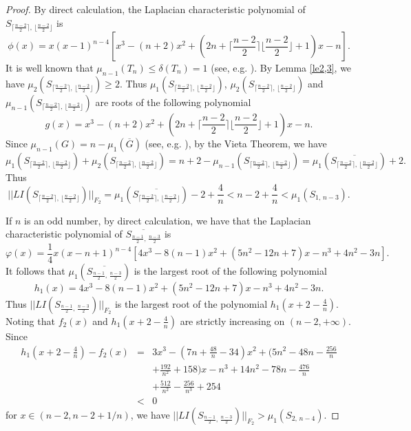 \documentclass[12pt, a4paper]{article}
\begin{document}
\begin{proof}
By direct calculation, the Laplacian characteristic polynomial of $S_{\lceil\frac{n-2}{2}\rceil, \, \lfloor\frac{n-2}{2}\rfloor}$ is
$$\phi(x)=x(x-1)^{n-4}[x^3-(n+2)x^2+(2n+\lceil\frac{n-2}{2}\rceil \lfloor\frac{n-2}{2}\rfloor+1)x-n].$$
It is well known that  $\mu_{n-1}(T_n)\leq \delta(T_n)=1$ (see, e.g. \cite{F}).  By Lemma \ref{le2,3}, we have $\mu_{2}(S_{\lceil\frac{n-2}{2}\rceil, \, \lfloor\frac{n-2}{2}\rfloor})\geq 2$. Thus $\mu_1(S_{\lceil\frac{n-2}{2}\rceil, \, \lfloor\frac{n-2}{2}\rfloor})$, $\mu_{2}(S_{\lceil\frac{n-2}{2}\rceil, \, \lfloor\frac{n-2}{2}\rfloor})$ and $\mu_{n-1}(S_{\lceil\frac{n-2}{2}\rceil, \, \lfloor\frac{n-2}{2}\rfloor})$ are roots of the following polynomial
$$g(x)= x^3-(n+2)x^2+(2n+\lceil\frac{n-2}{2}\rceil \lfloor\frac{n-2}{2}\rfloor+1)x-n.$$
Since $\mu_{n-1}(G)=n-\mu_1(\overline{G})$ (see, e.g. \cite{M}), by the Vieta Theorem, we have
$$\mu_1(S_{\lceil\frac{n-2}{2}\rceil, \, \lfloor\frac{n-2}{2}\rfloor})+\mu_{2}(S_{\lceil\frac{n-2}{2}\rceil, \, \lfloor\frac{n-2}{2}\rfloor})=n+2- \mu_{n-1}(S_{\lceil\frac{n-2}{2}\rceil, \, \lfloor\frac{n-2}{2}\rfloor})=\mu_1(\overline{S_{\lceil\frac{n-2}{2}\rceil, \, \lfloor\frac{n-2}{2}\rfloor}})+2.$$
Thus
$$||LI(S_{\lceil\frac{n-2}{2}\rceil, \, \lfloor\frac{n-2}{2}\rfloor})||_{F_2}=\mu_1(\overline{S_{\lceil\frac{n-2}{2}\rceil, \, \lfloor\frac{n-2}{2}\rfloor}})-2+\frac{4}{n}<n-2+\frac{4}{n}<\mu_1(S_{1,\,n-3}).$$

If $n$ is an odd number, by direct calculation, we have that the Laplacian characteristic polynomial of $\overline{S_{\frac{n-1}{2}, \, \frac{n-3}{2}}}$ is
$$\varphi(x)=\frac{1}{4}x(x-n+1)^{n-4}[4x^3-8(n-1)x^2+(5n^2-12n+7)x-n^3+4n^2-3n].$$
It follows that $\mu_1(\overline{S_{\frac{n-1}{2}, \, \frac{n-3}{2}}})$ is the largest root of the following polynomial
$$h_1(x)=4x^3-8(n-1)x^2+(5n^2-12n+7)x-n^3+4n^2-3n.$$
Thus $||LI(S_{\frac{n-1}{2}, \, \frac{n-3}{2}})||_{F_2}$ is the largest root of the polynomial $h_1(x+2-\frac{4}{n})$. Noting that $f_2(x)$ and $h_1(x+2-\frac{4}{n})$ are strictly increasing on $(n-2, +\infty)$. Since
\begin{eqnarray*}
h_1(x+2-\frac{4}{n})-f_2(x) & = & 3x^3-(7n+\frac{48}{n}-34)x^2+(5n^2-48n-\frac{256}{n}\\
& & +\frac{192}{n^2}+158)x-n^3+14n^2-78n-\frac{476}{n}\\
& & +\frac{512}{n^2}-\frac{256}{n^3}+254\\
& < & 0
\end{eqnarray*}
for $x\in (n-2, n-2+1/n)$, we have $||LI(S_{\frac{n-1}{2}, \, \frac{n-3}{2}})||_{F_2}>\mu_1(S_{2,\,n-4})$.


\end{proof}
\end{document}
